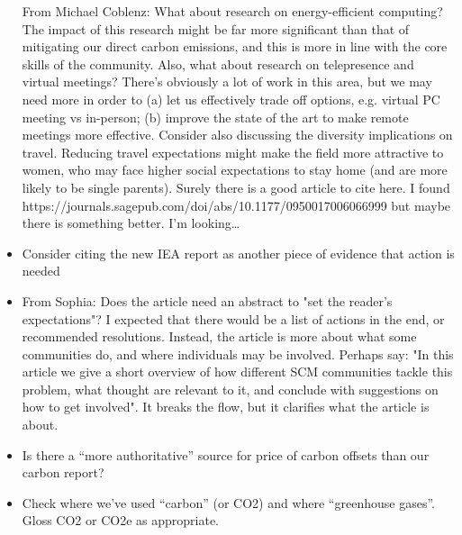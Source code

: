 \documentclass[12pt]{article}
\begin{document}
\begin{itemize}
From Michael Coblenz:
What about research on energy-efficient computing? The impact of this research might be far more significant than that of mitigating our direct carbon emissions, and this is more in line with the core skills of the community.
Also, what about research on telepresence and virtual meetings? There's obviously a lot of work in this area, but we may need more in order to (a) let us effectively trade off options, e.g. virtual PC meeting vs in-person; (b) improve the state of the art to make remote meetings more effective.
Consider also discussing the diversity implications on travel. Reducing travel expectations might make the field more attractive to women, who may face higher social expectations to stay home (and are more likely to be single parents). Surely there is a good article to cite here. I found https://journals.sagepub.com/doi/abs/10.1177/0950017006066999 but maybe there is something better. I'm looking…
\item 
Consider citing the new IEA report as another piece of evidence that action is needed
\item 
From Sophia: Does the article need an abstract to "set the reader's expectations"? I expected that there would be a list of actions in the end, or recommended resolutions. Instead, the article is more about what some communities do, and where individuals may be involved.  Perhaps say: "In this article we give a short overview of how different SCM communities tackle this problem, what thought are relevant to it, and conclude with suggestions on how to get involved". It breaks the flow, but it clarifies what the article is about.
\item 
Is there a ``more authoritative'' source for price of carbon offsets than
our carbon report?
\item 
Check where we've used ``carbon'' (or CO2) and where ``greenhouse gases''.  Gloss CO2 or CO2e as appropriate.
\end{itemize}
\fi

\end{document}
